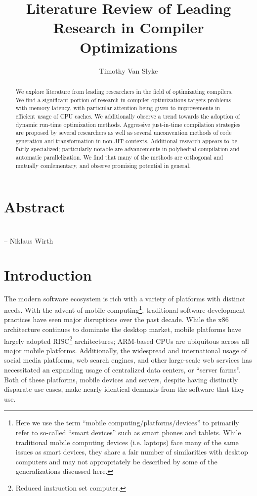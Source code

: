 \documentclass[nobib]{tufte-handout}
\title{Literature Review of Leading Research in Compiler Optimizations}
\author{Timothy Van Slyke}
\begin{document}
\maketitle
\section*{Abstract}
\begin{abstract}
We explore literature from leading researchers in the field of optimizating compilers.  We find a significant portion of research in compiler optimizations targets problems with memory latency, with particular attention being given to improvements in efficient usage of CPU caches.  We additionally observe a trend towards the adoption of dynamic run-time optimization methods.  Aggressive just-in-time compilation strategies are proposed by several researchers as well as several unconvention methods of code generation and transformation in non-JIT contexts.  Additional research appears to be fairly specialized; particularly notable are advancements in polyhedral compilation and automatic parallelization.  We find that many of the methods are orthogonal and mutually comlementary, and observe promising potential in general.
\end{abstract}

\section*{}
\newline\noindent\hfill{-- Niklaus Wirth} \\
\section{Introduction}
The modern software ecosystem is rich with a variety of platforms with distinct needs.  With the advent of mobile computing\footnote{Here we use the term ``mobile computing/platforms/devices'' to primarily refer to so-called ``smart devices'' such as smart phones and tablets.  While traditional mobile computing devices (i.e. laptops) face many of the same issues as smart devices, they share a fair number of similarities with desktop computers and may not appropriately be described by some of the generalizations discussed here.}, traditional software development practices have seen major disruptions over the past decade.  While the x86 architecture continues to dominate the desktop market, mobile platforms have largely adopted RISC\footnote{Reduced instruction set computer.} architectures; ARM-based CPUs are ubiquitous across all major mobile platforms.  Additionally, the widespread and international usage of social media platforms, web search engines, and other large-scale web services has necessitated an expanding usage of centralized data centers, or ``server farms''.  Both of these platforms, mobile devices and servers, despite having distinctly disparate use cases, make nearly identical demands from the software that they use.
\end{document}
